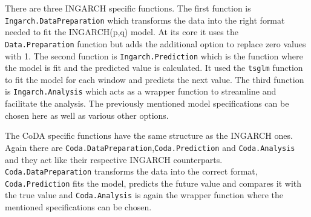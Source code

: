 There are three INGARCH specific functions. The first function is \texttt{Ingarch.DataPreparation} which transforms the data into the right format needed to fit the INGARCH(p,q) model. At its core it uses the \texttt{Data.Preparation} function but adds the additional option to replace zero values with 1. The second function is \texttt{Ingarch.Prediction} which is the function where the model is fit and the predicted value is calculated. It used the \texttt{tsglm} function to fit the model for each window and predicts the next value. The third function is \texttt{Ingarch.Analysis} which acts as a wrapper function to streamline and facilitate the analysis. The previously mentioned model specifications can be chosen here as well as various other options. 

The CoDA specific functions have the same structure as the INGARCH ones. Again there are \texttt{Coda.DataPreparation},\texttt{Coda.Prediction} and \texttt{Coda.Analysis} and they act like their respective INGARCH counterparts. \texttt{Coda.DataPreparation} transforms the data into the correct format, \texttt{Coda.Prediction} fits the model, predicts the future value and compares it with the true value and \texttt{Coda.Analysis} is again the wrapper function where the mentioned specifications can be chosen. 